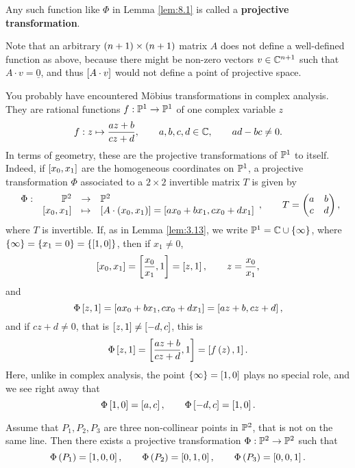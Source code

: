 \begin{definition}
Any such function like $ \Phi $ in Lemma \ref{lem:8.1} is called a \textbf{projective transformation}.
\end{definition}

\begin{remark}
Note that an arbitrary $ \rb{n + 1} \times \rb{n + 1} $ matrix $ A $ does not define a well-defined function as above, because there might be non-zero vectors $ v \in \C^{n + 1} $ such that $ A \cdot v = \underline{0} $, and thus $ \sb{A \cdot v} $ would not define a point of projective space.
\end{remark}

\begin{example}
\label{eg:8.4}
You probably have encountered M\"obius transformations in complex analysis. They are rational functions $ f : \P^1 \to \P^1 $ of one complex variable $ z $
$$ f : z \mapsto \dfrac{az + b}{cz + d}, \qquad a, b, c, d \in \C, \qquad ad - bc \ne 0. $$
In terms of geometry, these are the projective transformations of $ \P^1 $ to itself. Indeed, if $ \sb{x_0, x_1} $ are the homogeneous coordinates on $ \P^1 $, a projective transformation $ \Phi $ associated to a $ 2 \times 2 $ invertible matrix $ T $ is given by
$$ \function[\Phi]{\P^2}{\P^2}{\sb{x_0, x_1}}{\sb{A \cdot \rb{x_0, x_1}} = \sb{ax_0 + bx_1, cx_0 + dx_1}}, \qquad T = \twobytwo{a}{b}{c}{d}, $$
where $ T $ is invertible. If, as in Lemma \ref{lem:3.13}, we write $ \P^1 = \C \cup \cb{\infty} $, where $ \cb{\infty} = \cb{x_1 = 0} = \cb{\sb{1, 0}} $, then if $ x_1 \ne 0 $,
$$ \sb{x_0, x_1} = \sb{\dfrac{x_0}{x_1}, 1} = \sb{z, 1}, \qquad z = \dfrac{x_0}{x_1}, $$
and
$$ \Phi\sb{z, 1} = \sb{ax_0 + bx_1, cx_0 + dx_1} = \sb{az + b, cz + d}, $$
and if $ cz + d \ne 0 $, that is $ \sb{z, 1} \ne \sb{-d, c} $, this is
$$ \Phi\sb{z, 1} = \sb{\dfrac{az + b}{cz + d}, 1} = \sb{f\rb{z}, 1}. $$
Here, unlike in complex analysis, the point $ \cb{\infty} = \sb{1, 0} $ plays no special role, and we see right away that
$$ \Phi\sb{1, 0} = \sb{a, c}, \qquad \Phi\sb{-d, c} = \sb{1, 0}. $$
\end{example}

\begin{theorem}
\label{thm:8.5}
Assume that $ P_1, P_2, P_3 $ are three non-collinear points in $ \P^2 $, that is not on the same line. Then there exists a projective transformation $ \Phi : \P^2 \to \P^2 $ such that
$$ \Phi\rb{P_1} = \sb{1, 0, 0}, \qquad \Phi\rb{P_2} = \sb{0, 1, 0}, \qquad \Phi\rb{P_3} = \sb{0, 0, 1}. $$
\end{theorem}

